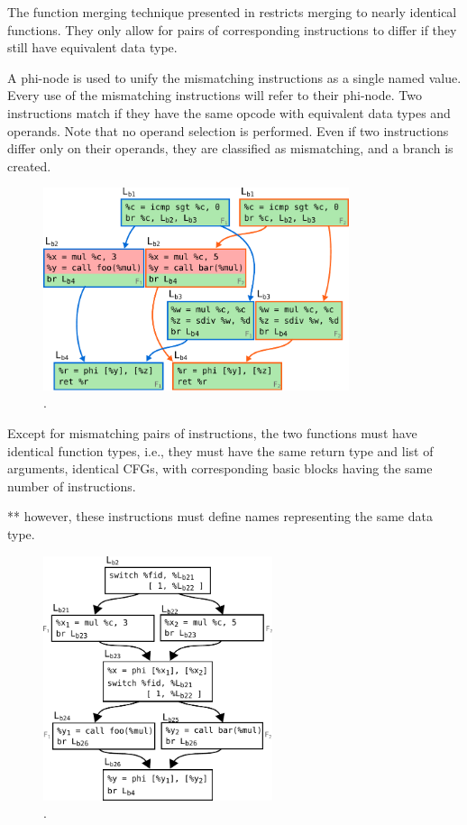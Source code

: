 

The function merging technique presented in \cite{edler14} restricts merging to nearly identical functions. They only allow for pairs of corresponding instructions to differ if they still have equivalent data type.


A phi-node is used to unify the mismatching instructions as a single named value.
Every use of the mismatching instructions will refer to their phi-node.
Two instructions match if they have the same opcode with equivalent data types and operands.
Note that no operand selection is performed.
Even if two instructions differ only on their operands, they are classified as mismatching, and a branch is created.

 \begin{figure}[h]
   \centering
   \includegraphics[width=0.8\textwidth]{src/relatedwork/figs/soa-example-1.pdf}
   \caption{.}
   \label{fig:soa-example-1}
 \end{figure}

Except for mismatching pairs of instructions, the two functions must have identical function types, i.e., they must have the same return type and list of arguments, identical CFGs, with corresponding basic blocks having the same number of instructions.

** however, these instructions must define names representing the same data type.

 \begin{figure}[h]
   \centering
   \includegraphics[width=0.6\textwidth]{src/relatedwork/figs/soa-example-2.pdf}
   \caption{.}
   \label{fig:soa-example-2}
 \end{figure}



